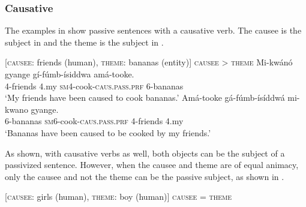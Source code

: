 \documentclass[output=paper,
            colorlinks, citecolor=brown
            ,draftmode
		  ]{langscibook}
\begin{document}
\subsubsection{Causative}\label{sec:yoneda:3.2.3}



The examples in  show passive sentences with a causative verb. The causee is the subject in  and the theme is the subject in . 



\ea%
    \label{ex:yoneda:24}
    {[\textsc{causee}: friends (human), \textsc{theme}: bananas (entity)]}  \textsc{causee} > \textsc{theme}
    \ea\label{ex:yoneda:24a}\gll Mi-kwánó   gyange  gí-fúmb-ísiddwa               amá-tooke.\\
         4-friends      4.my    \textsc{sm4}-cook-\textsc{caus.pass.prf}    6-bananas\\
    \glt ‘My friends have been caused to cook bananas.’ 
    \ex\label{ex:yoneda:24b} \gll Amá-tooke    gá-fúmb-ísíddwá              mi-kwano gyange.\\
    6-bananas    \textsc{sm6}-cook-\textsc{caus.pass.prf}    4-friends 4.my\\
    \glt ‘Bananas have been caused to be cooked by my friends.’
    \z
\z



    As shown, with causative verbs as well, both objects can be the subject of a passivized sentence. However, when the causee and theme are of equal animacy, only the causee and not the theme can be the passive subject, as shown in . 


\ea%
    \label{ex:yoneda:25}
    [\textsc{causee}: girls (human), \textsc{theme}: boy (human)]  \textsc{causee} = \textsc{theme}\\
    \z
\z
\end{document}
